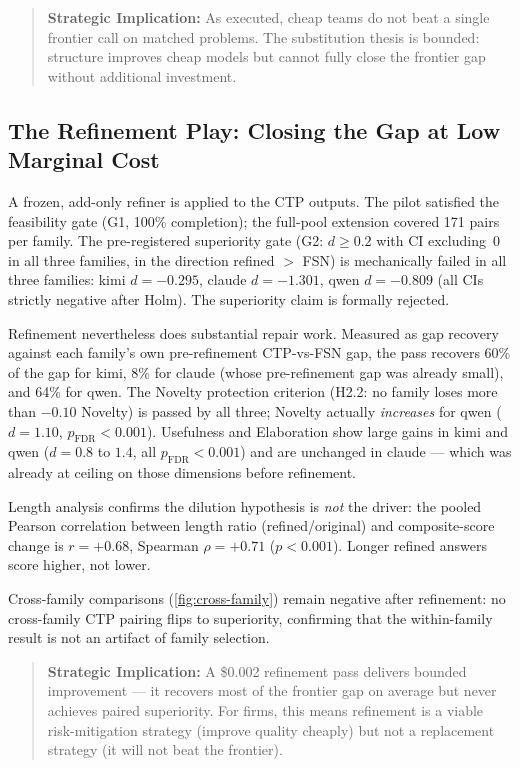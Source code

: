 \documentclass[12pt,a4paper]{article}
\begin{document}
\begin{quote}
\textbf{Strategic Implication:} As executed, cheap teams do not beat a single
frontier call on matched problems. The substitution thesis is bounded: structure
improves cheap models but cannot fully close the frontier gap without additional
investment.
\end{quote}

\subsection{The Refinement Play: Closing the Gap at Low Marginal Cost}\label{sec:refinement}

A frozen, add-only refiner is applied to the CTP outputs. The pilot satisfied
the feasibility gate (G1, 100\% completion); the full-pool extension covered 171
pairs per family. The pre-registered superiority gate (G2: $d \ge 0.2$ with CI
excluding~0 in all three families, in the direction refined $>$ FSN) is
mechanically failed in all three families: kimi $d = -0.295$, claude $d =
-1.301$, qwen $d = -0.809$ (all CIs strictly negative after Holm). The
superiority claim is formally rejected.

Refinement nevertheless does substantial repair work. Measured as gap recovery
against each family's own pre-refinement CTP-vs-FSN gap, the pass recovers 60\%
of the gap for kimi, 8\% for claude (whose pre-refinement gap was already
small), and 64\% for qwen. The Novelty protection criterion (H2.2: no family
loses more than $-0.10$ Novelty) is passed by all three; Novelty actually
\emph{increases} for qwen ($d = 1.10$, $p_{\mathrm{FDR}} < 0.001$). Usefulness
and Elaboration show large gains in kimi and qwen ($d = 0.8$ to $1.4$, all
$p_{\mathrm{FDR}} < 0.001$) and are unchanged in claude --- which was already at
ceiling on those dimensions before refinement.

Length analysis confirms the dilution hypothesis is \emph{not} the driver: the
pooled Pearson correlation between length ratio (refined/original) and
composite-score change is $r = +0.68$, Spearman $\rho = +0.71$ ($p < 0.001$).
Longer refined answers score higher, not lower.

Cross-family comparisons (\cref{fig:cross-family}) remain negative after
refinement: no cross-family CTP pairing flips to superiority, confirming that
the within-family result is not an artifact of family selection.

\begin{quote}
\textbf{Strategic Implication:} A \$0.002 refinement pass delivers bounded
improvement --- it recovers most of the frontier gap on average but never
achieves paired superiority. For firms, this means refinement is a viable
risk-mitigation strategy (improve quality cheaply) but not a replacement
strategy (it will not beat the frontier).
\end{quote}
\end{document}
